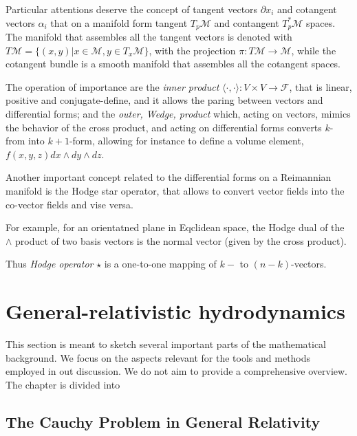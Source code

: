 Particular attentions deserve the concept of tangent vectors $\partial x_i$ and cotangent vectors $\alpha_i$ that on a manifold form tangent $T_p \mathcal{M}$ and contangent $T_p^*\mathcal{M}$ spaces. The manifold that assembles all the tangent vectors is denoted with $T\mathcal{M} = \{ (x,y) | x\in \mathcal{M}, y \in T_x \mathcal{M} \}$, with the projection $\pi:T\mathcal{M}\rightarrow \mathcal{M}$, while the cotangent bundle is a smooth manifold that assembles all the cotangent spaces.

The operation of importance are the \textit{inner product} $\langle \cdot,\cdot \rangle : V \times V \rightarrow \mathcal{F}$, that is linear, positive and conjugate-define, and it allows the paring between vectors and differential forms; 
and the \textit{outer, Wedge, product} which, acting on vectors, mimics the behavior of the cross product, and acting on differential forms converts $k$-from into $k+1$-form, allowing for instance to define a volume element, $f(x,y,z)dx \wedge dy \wedge dz$. 

Another important concept related to the differential forms on a Reimannian manifold is the Hodge star operator, that allows to convert vector fields into the co-vector fields and vise versa.

For example, for an orientatned plane in Eqclidean space,
the Hodge dual of the $\wedge$ product of two basis vectors is the normal vector (given by the cross product).

Thus \textit{Hodge operator} $\star$ is a one-to-one mapping of $k-$ to $(n-k)$-vectors.


\section{General-relativistic hydrodynamics}

This section is meant to sketch several important parts of the mathematical background. 
We focus on the aspects relevant for the tools and methods employed in out discussion. 
We do not aim to provide a comprehensive overview. 
The chapter is divided into 

    

\subsection{The Cauchy Problem in General Relativity}

